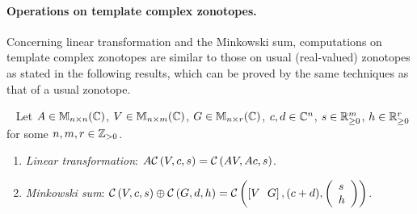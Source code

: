 \paragraph*{\bf Operations on template complex zonotopes.}
Concerning linear transformation and the Minkowski sum, computations
on template complex zonotopes are similar to those on usual (real-valued) zonotopes
as stated in the following results, which can be proved by the same
techniques as that of a usual zonotope. %
%
\begin{lem}~\label{lem:lt}
  Let $A\in\mathbb{M}_{n\times n}(\mathbb{C})$, $V\in\mathbb{M}_{n\times m}(\mathbb{C})$, $G\in\mathbb{M}_{n\times r}(\mathbb{C})$, $c,d\in\mathbb{C}^n$, $s\in{{\mathbb{R}}}^m_{\geq 0}$,
  $h\in\mathbb{R}^r_{\geq 0}$ for some $n,m,r\in\mathbb{Z}_{> 0}$.
  
\begin{enumerate}%
\item \emph{Linear transformation}: $A\mathcal{C}\left(V,c,s\right)=\mathcal{C}\left(AV,Ac,s\right)$.
\item \emph{Minkowski sum}: $\mathcal{C}\left(V,c,s\right)\oplus\mathcal{C}\left(G,d,h\right)=\mathcal{C}\left(\left[V~~G\right],(c+d),\left(\begin{array}{l}s\\h\end{array}\right)\right)$.
\end{enumerate}
\end{lem}
%


